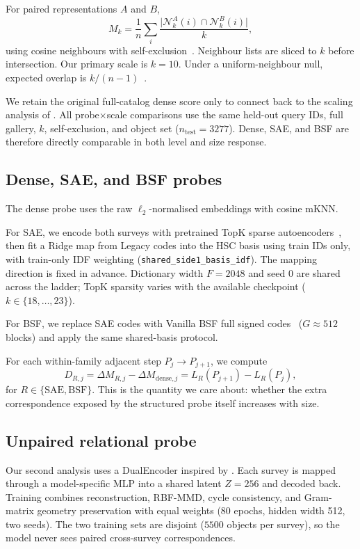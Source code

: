 \documentclass[11pt]{article}
\begin{document}
For paired representations \(A\) and \(B\),
\[
M_k=\frac{1}{n}\sum_i
\frac{\lvert \mathcal N_k^A(i)\cap \mathcal N_k^B(i)\rvert}{k},
\]
using cosine neighbours with self-exclusion~\citep{huh2024platonic,duraphe2025platonicuniverse}.
Neighbour lists are sliced to \(k\) before intersection.
Our primary scale is \(k{=}10\).
Under a uniform-neighbour null, expected overlap is \(k/(n{-}1)\)~\citep{groger2026aristotelian}.

We retain the original full-catalog dense score only to connect back to the scaling analysis of \citet{duraphe2025platonicuniverse}.
All probe\(\times\)scale comparisons use the same held-out query IDs, full gallery, \(k\), self-exclusion, and object set (\(n_{\mathrm{test}}{=}3277\)).
Dense, SAE, and BSF are therefore directly comparable in both level and size response.

\subsection{Dense, SAE, and BSF probes}

The dense probe uses the raw \(\ell_2\)-normalised embeddings with cosine mKNN.

For SAE, we encode both surveys with pretrained TopK sparse autoencoders~\citep{gao2025sae}, then fit a Ridge map from Legacy codes into the HSC basis using train IDs only, with train-only IDF weighting (\texttt{shared\_side1\_basis\_idf}).
The mapping direction is fixed in advance.
Dictionary width \(F{=}2048\) and seed \(0\) are shared across the ladder; TopK sparsity varies with the available checkpoint (\(k\in\{18,\ldots,23\}\)).

For BSF, we replace SAE codes with Vanilla BSF full signed codes~\citep{fel2026bsf} (\(G{\approx}512\) blocks) and apply the same shared-basis protocol.

For each within-family adjacent step \(P_j\to P_{j+1}\), we compute
\[
D_{R,j}
=
\Delta M_{R,j}
-
\Delta M_{\mathrm{dense},j}
=
L_R(P_{j+1})-L_R(P_j),
\]
for \(R\in\{\mathrm{SAE},\mathrm{BSF}\}\).
This is the quantity we care about: whether the extra correspondence exposed by the structured probe itself increases with size.

\subsection{Unpaired relational probe}

Our second analysis uses a DualEncoder inspired by \citet{jha2025vec2vec}.
Each survey is mapped through a model-specific MLP into a shared latent \(Z{=}256\) and decoded back.
Training combines reconstruction, RBF-MMD, cycle consistency, and Gram-matrix geometry preservation with equal weights (80 epochs, hidden width 512, two seeds).
The two training sets are disjoint (\(5500\) objects per survey), so the model never sees paired cross-survey correspondences.
\end{document}
